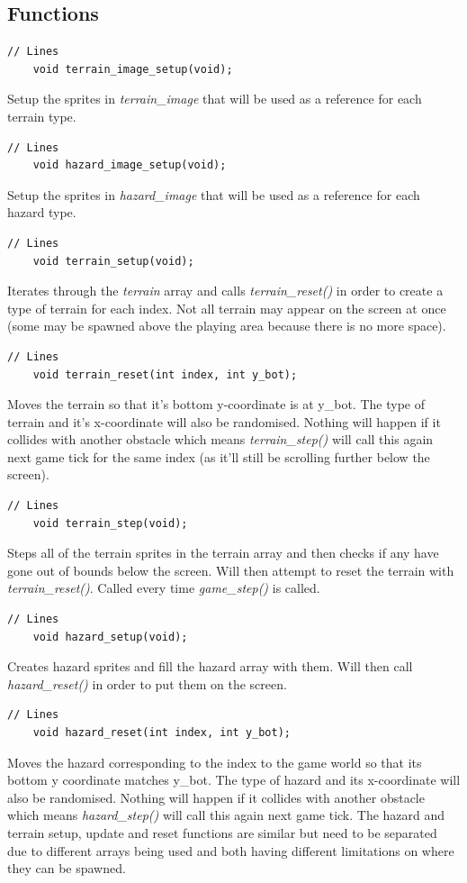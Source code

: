\documentclass{article}
\begin{document}
\subsection*{Functions}
\begin{lstlisting}[style=CStyle]
	// Lines 
	void terrain_image_setup(void);
\end{lstlisting}
Setup the sprites in \emph{terrain\_image} that will be used as a reference for each terrain type.
\begin{lstlisting}[style=CStyle]
	// Lines 
	void hazard_image_setup(void);
\end{lstlisting}
Setup the sprites in \emph{hazard\_image} that will be used as a reference for each hazard type.
\begin{lstlisting}[style=CStyle]
	// Lines
	void terrain_setup(void);
\end{lstlisting}
Iterates through the \emph{terrain} array and calls \emph{terrain\_reset()} in order to create a type of terrain for each index. Not all terrain may appear on the screen at once (some may be spawned above the playing area because there is no more space).
\begin{lstlisting}[style=CStyle]
	// Lines 
	void terrain_reset(int index, int y_bot);
\end{lstlisting}
Moves the terrain so that it's bottom y-coordinate is at y\_bot. The type of terrain and it's x-coordinate will also be randomised. Nothing will happen if it collides with another obstacle which means \emph{terrain\_step()} will call this again next game tick for the same index (as it'll still be scrolling further below the screen).
\begin{lstlisting}[style=CStyle]
	// Lines 
	void terrain_step(void);
\end{lstlisting}
Steps all of the terrain sprites in the terrain array and then checks if any have gone out of bounds below the screen. Will then attempt to reset the terrain with \emph{terrain\_reset()}. Called every time \emph{game\_step()} is called.
\begin{lstlisting}[style=CStyle]
	// Lines 
	void hazard_setup(void);
\end{lstlisting}
Creates hazard sprites and fill the hazard array with them. Will then call \emph{hazard\_reset()} in order to put them on the screen.
\begin{lstlisting}[style=CStyle]
	// Lines
	void hazard_reset(int index, int y_bot);
\end{lstlisting}
Moves the hazard corresponding to the index to the game world so that its bottom y coordinate matches y\_bot. The type of hazard and its x-coordinate will also be randomised. Nothing will happen if it collides with another obstacle which means \emph{hazard\_step()} will call this again next game tick. The hazard and terrain setup, update and reset functions are similar but need to be separated due to different arrays being used and both having different limitations on where they can be spawned.
\end{document}

